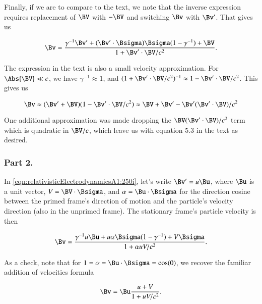 Finally, if we are to compare to the text, we note that the inverse expression requires replacement of $\BV$ with $-\BV$ and switching $\Bv$ with $\Bv'$.  That gives us

\begin{equation}\label{eqn:relativisticElectrodynamicsA1:250i}
\Bv = \frac{\gamma^{-1} \Bv' + (\Bv' \cdot \Bsigma) \Bsigma (1 - \gamma^{-1}) + \BV}{ 1 + \Bv' \cdot \BV/c^2 }.
\end{equation}

The expression in the text is also a small velocity approximation.  For $\Abs{\BV} \ll c$, we have $\gamma^{-1} \approx 1$, and $(1 + \Bv' \cdot \BV/c^2)^{-1} \approx 1 - \Bv' \cdot \BV/c^2$.  This gives us

\begin{equation}\label{eqn:relativisticElectrodynamicsA1:250a}
\Bv \approx (\Bv' + \BV)( 1 - \Bv' \cdot \BV/c^2 ) \approx \BV + \Bv' - \Bv' (\Bv' \cdot \BV)/c^2
\end{equation}

One additional approximation was made dropping the $\BV (\Bv' \cdot \BV)/c^2$ term which is quadratic in $\BV/c$, which leave us with equation $5.3$ in the text as desired.

\subsubsection{Part 2.}

In \ref{eqn:relativisticElectrodynamicsA1:250i}, let's write $\Bv' = u \Bu$, where $\Bu$ is a unit vector, $V = \BV \cdot \Bsigma$, and $\alpha = \Bu \cdot \Bsigma$ for the direction cosine between the primed frame's direction of motion and the particle's velocity direction (also in the unprimed frame).  The stationary frame's particle velocity is then

\begin{equation}\label{eqn:relativisticElectrodynamicsA1:260}
\Bv = \frac{\gamma^{-1} u \Bu + u \alpha \Bsigma (1 - \gamma^{-1}) + V \Bsigma}{ 1 + \alpha u V/c^2 }.
\end{equation}

As a check, note that for $1 = \alpha = \Bu \cdot \Bsigma = \cos(0)$, we recover the familiar addition of velocities formula 

\begin{equation}\label{eqn:relativisticElectrodynamicsA1:260b}
\Bv = \Bu \frac{u + V}{ 1 + u V/c^2 }.
\end{equation}

